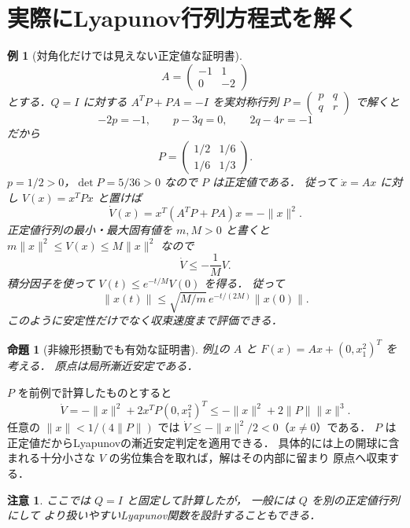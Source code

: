 \documentclass[a5paper,10pt,onecolumn]{jsarticle}
\makeatletter
\theoremstyle{mathnotetheorem}
\newtheorem{proposition}[theorem]{命題}
\newtheorem{example}[theorem]{例}
\newtheorem{remark}[theorem]{注意}
\renewcommand{\proofname}{証明}
\renewenvironment{proof}[1][\proofname]{%
  \par\pushQED{\qed}\normalfont\topsep4\p@\@plus2\p@\relax
  \trivlist\item[\hskip\labelsep\bfseries #1]\ignorespaces
}{\popQED\endtrivlist\@endpefalse}
\makeatother
\begin{document}
\section{実際にLyapunov行列方程式を解く}
\begin{example}[対角化だけでは見えない正定値な証明書]\label{ex:lyap-matrix-explicit}
\[
 A=\begin{pmatrix}-1&1\\0&-2\end{pmatrix}
\]
とする．$Q=I$ に対する
$A^TP+PA=-I$ を実対称行列
$P=\begin{pmatrix}p&q\\q&r\end{pmatrix}$ で解くと
\[
 -2p=-1,\qquad p-3q=0,\qquad2q-4r=-1
\]
だから
\[
 P=\begin{pmatrix}1/2&1/6\\1/6&1/3\end{pmatrix}.
\]
$p=1/2>0$，$\det P=5/36>0$ なので
$P$ は正定値である．
従って $\dot x=Ax$ に対し
$V(x)=x^TPx$ と置けば
\[
 \dot V(x)=x^T(A^TP+PA)x=-\|x\|^2.
\]
正定値行列の最小・最大固有値を
$m,M>0$ と書くと
$m\|x\|^2\le V(x)\le M\|x\|^2$ なので
\[
 \dot V\le-\frac1M V.
\]
積分因子を使って
$V(t)\le e^{-t/M}V(0)$ を得る．
従って
\[
 \|x(t)\|\le\sqrt{M/m}\,e^{-t/(2M)}\|x(0)\|.
\]
このように安定性だけでなく収束速度まで評価できる．
\end{example}
\begin{proposition}[非線形摂動でも有効な証明書]
例\ref{ex:lyap-matrix-explicit}の $A$ と
$F(x)=Ax+(0,x_1^2)^T$ を考える．
原点は局所漸近安定である．
\end{proposition}
\begin{proof}
$P$ を前例で計算したものとすると
\[
 \dot V=-\|x\|^2+2x^TP(0,x_1^2)^T
 \le-\|x\|^2+2\|P\|\|x\|^3.
\]
任意の $\|x\|<1/(4\|P\|)$ では
$\dot V\le-\|x\|^2/2<0$（$x\ne0$）である．
$P$ は正定値だからLyapunovの漸近安定判定を適用できる．
具体的には上の開球に含まれる十分小さな
$V$ の劣位集合を取れば，解はその内部に留まり
原点へ収束する．
\end{proof}
\begin{remark}
ここでは $Q=I$ と固定して計算したが，
一般には $Q$ を別の正定値行列にして
より扱いやすいLyapunov関数を設計することもできる．
\end{remark}
\end{document}
